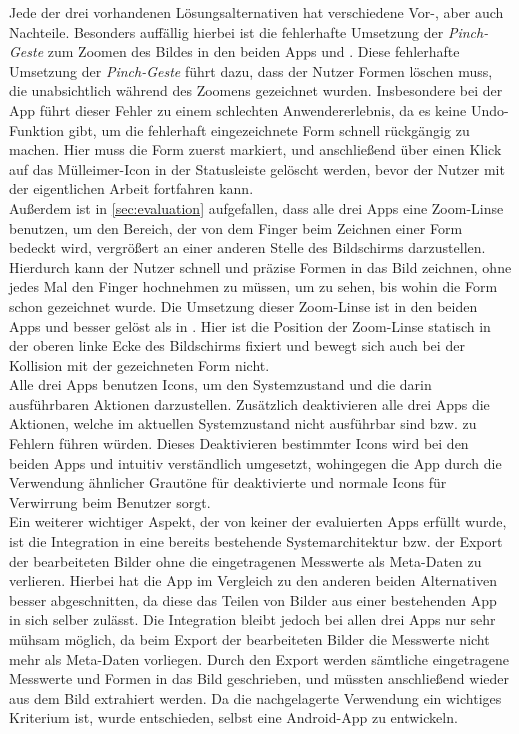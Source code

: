 Jede der drei vorhandenen Lösungsalternativen hat verschiedene Vor-, aber auch Nachteile.
Besonders auffällig hierbei ist die fehlerhafte Umsetzung der \emph{Pinch-Geste} zum Zoomen des Bildes in den beiden Apps \mm{} und \pm{}.
Diese fehlerhafte Umsetzung der \emph{Pinch-Geste} führt dazu, dass der Nutzer Formen löschen muss, die unabsichtlich während des Zoomens gezeichnet wurden.
Insbesondere bei der App \pm{} führt dieser Fehler zu einem schlechten Anwendererlebnis, da es keine Undo-Funktion gibt, um die fehlerhaft eingezeichnete Form schnell rückgängig zu machen.
Hier muss die Form zuerst markiert, und anschließend über einen Klick auf das Mülleimer-Icon in der Statusleiste gelöscht werden, bevor der Nutzer mit der eigentlichen Arbeit fortfahren kann. \\

Außerdem ist in \autoref{sec:evaluation} aufgefallen, dass alle drei Apps eine Zoom-Linse benutzen, um den Bereich, der von dem Finger beim Zeichnen einer Form bedeckt wird, vergrößert an einer anderen Stelle des Bildschirms darzustellen.
Hierdurch kann der Nutzer schnell und präzise Formen in das Bild zeichnen, ohne jedes Mal den Finger hochnehmen zu müssen, um zu sehen, bis wohin die Form schon gezeichnet wurde.
Die Umsetzung dieser Zoom-Linse ist in den beiden Apps \mm{} und \pm{} besser gelöst als in \im{}.
Hier ist die Position der Zoom-Linse statisch in der oberen linke Ecke des Bildschirms fixiert und bewegt sich auch bei der Kollision mit der gezeichneten Form nicht. \\

Alle drei Apps benutzen Icons, um den Systemzustand und die darin ausführbaren Aktionen darzustellen.
Zusätzlich deaktivieren alle drei Apps die Aktionen, welche im aktuellen Systemzustand nicht ausführbar sind bzw. zu Fehlern führen würden.
Dieses Deaktivieren bestimmter Icons wird bei den beiden Apps \mm{} und \pm{} intuitiv verständlich umgesetzt, wohingegen die App \im{} durch die Verwendung ähnlicher Grautöne für deaktivierte und normale Icons für Verwirrung beim Benutzer sorgt. \\

Ein weiterer wichtiger Aspekt, der von keiner der evaluierten Apps erfüllt wurde, ist die Integration in eine bereits bestehende Systemarchitektur bzw. der Export der bearbeiteten Bilder ohne die eingetragenen Messwerte als Meta-Daten zu verlieren. 
Hierbei hat die App \im{} im Vergleich zu den anderen beiden Alternativen besser abgeschnitten, da diese das Teilen von Bilder aus einer bestehenden App in sich selber zulässt.
Die Integration bleibt jedoch bei allen drei Apps nur sehr mühsam möglich, da beim Export der bearbeiteten Bilder die Messwerte nicht mehr als Meta-Daten vorliegen.
Durch den Export werden sämtliche eingetragene Messwerte und Formen in das Bild geschrieben, und müssten anschließend wieder aus dem Bild extrahiert werden.
Da die nachgelagerte Verwendung ein wichtiges Kriterium ist, wurde entschieden, selbst eine Android-App zu entwickeln.


